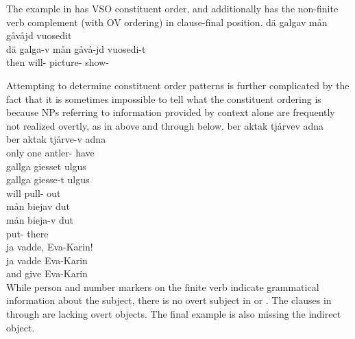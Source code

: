 The example in  has VSO constituent order, and additionally has the non-finite verb complement (with OV ordering) in clause-final position.
\ea\label{deviantConstituentOrder4}%
\glll	dä galgav mån gåvåjd vuosedit\\
	dä galga-v mån gåvå-jd vuosedi-t\\
	then will-  picture-  show- \\\nopagebreak
{} 
\z

Attempting to determine constituent order patterns is further complicated by the fact that it is sometimes impossible to tell what the constituent ordering is because NPs referring to %
information provided by context alone are frequently not realized overtly, as in  above and  through  below.
\ea\label{missingNP1}
\glll	ber aktak tjårvev adna \\
	ber aktak tjårve-v adna \\
	only one antler- have\BS{}\\\nopagebreak
{} 
\z
\ea\label{missingNP2}%
\glll	gallga giesset ulgus\\
	gallga giesse-t ulgus\\
	will\BS{} pull- out\\\nopagebreak
{} 
\z
\ea\label{missingNP3}%
\glll	mån biejav dut\\
	mån bieja-v dut\\
	 put- there\\\nopagebreak
{} 
\z
\ea\label{missingNP4}%
\glll	ja vadde, Eva-Karin!\\
	ja vadde Eva-Karin\\
	and give\BS{} Eva-Karin\\\nopagebreak
{} 
\z
While person and number markers on the finite verb indicate grammatical information about the subject, there is no overt subject in  or . The clauses in  through  are lacking overt objects. The final example is also missing the indirect object.

